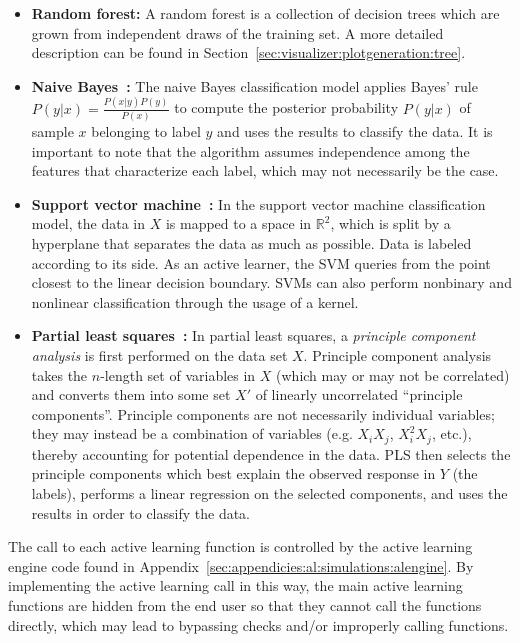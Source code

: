 \tablespacing
\begin{itemize}
	\item \textbf{Random forest:} A random forest is a collection of decision 
	trees which are grown from independent draws of the training set. A more 
	detailed description can be found in 
	Section~\ref{sec:visualizer:plotgeneration:tree}.
	
	\item \textbf{Naive Bayes~\cite{chai2004}:} 
	The naive Bayes classification model applies 
	Bayes' rule $P(y|x) = \frac{P(x|y)P(y)}{P(x)}$ to compute the posterior 
	probability $P(y|x)$ of sample $x$ belonging to label $y$ and uses the 
	results to classify the data. It is important to note that the algorithm 
	assumes independence among the features that characterize each label, which 
	may not necessarily be the case.
	
	\item \textbf{Support vector machine~\cite{tong2001}:} 
	In the support vector machine classification model, the data in $X$ is 
	mapped to a space in $\mathbb{R}^2$, which is split by a hyperplane that 
	separates the data as much as possible. Data is labeled according to its 
	side. As an active learner, the SVM queries from the point closest 
	to the linear decision boundary. SVMs can also perform nonbinary and 
	nonlinear classification through the usage of a kernel.
	
	\item \textbf{Partial least squares~\cite{boulesteix2006}:} 
	In partial least squares, 
	a \textit{principle component analysis} is first performed on the data set 
	$X$. Principle component analysis 
	takes the $n$-length set of variables in $X$ (which may or may not be 
	correlated) and converts them into some set $X'$ of linearly uncorrelated 
	``principle components''. Principle components are not necessarily 
	individual variables; they may instead be a combination of variables (e.g. 
	$X_iX_j$, $X^2_iX_j$, etc.), thereby accounting for potential dependence in 
	the data. PLS then selects the principle components which best explain the 
	observed response in $Y$ (the labels), performs a linear regression on the 
	selected components, and uses the results in order to classify the data. 
\end{itemize}
\bodyspacing

The call to each active learning function is controlled by the active learning 
engine code found in Appendix~\ref{sec:appendicies:al:simulations:alengine}. By 
implementing the active learning call in this way, the main active learning 
functions are hidden from the end user so that they cannot call the functions 
directly, which may lead to bypassing checks and/or improperly calling 
functions.



